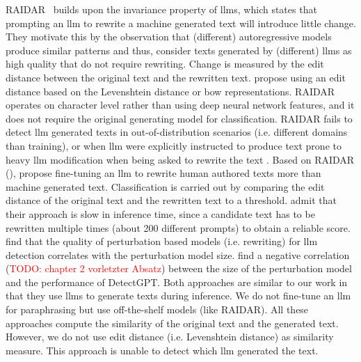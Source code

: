 RAIDAR~\citep{mao_raidar_2024} builds upon the invariance property of \acp{llm}, 
which states that prompting an \ac{llm} to rewrite a machine generated text will introduce little change.
They motivate this by the observation that (different) autoregressive models produce similar patterns and thus, 
consider texts generated by (different) \acp{llm} as high quality that do not require rewriting.
Change is measured by the edit distance between the original text and the rewritten text. 
\citet{mao_raidar_2024} propose using an edit distance based on the Levenshtein distance or \ac{bow} representations.
RAIDAR operates on character level rather than using deep neural network features, and it does not require the original generating model for classification. 
RAIDAR fails to detect \ac{llm} generated texts in out-of-distribution scenarios (i.e. different domains than training), 
or when \ac{llm} were explicitly instructed to produce text prone to heavy \ac{llm} modification when being asked to rewrite the text \citep{li_learning_2025}.
Based on RAIDAR (\citep{mao_raidar_2024}), \citet{li_learning_2025} propose fine-tuning an \ac{llm} to rewrite human authored texts more than machine generated text.
Classification is carried out by comparing the edit distance of the original text and the rewritten text to a threshold.
\citet{li_learning_2025} admit that their approach is slow in inference time, 
since a candidate text has to be rewritten multiple times (about 200 different prompts) to obtain a reliable score.
\citet{mao_raidar_2024} find that the quality of perturbation based models (i.e. rewriting) for \ac{llm} detection correlates with the perturbation model size.
\citet{mitchell_detectgpt_2023} find a negative correlation (\textcolor{red}{TODO: chapter 2 vorletzter Absatz}) between the size of the perturbation model and the performance of DetectGPT.
Both approaches are similar to our work in that they use \acp{llm} to generate texts during inference.
We do not fine-tune an \ac{llm} for paraphrasing but use off-the-shelf models (like RAIDAR).
All these approaches compute the similarity of the original text and the generated text.
However, we do not use edit distance (i.e. Levenshtein distance) as similarity measure.
This approach is unable to detect which \ac{llm} generated the text.

